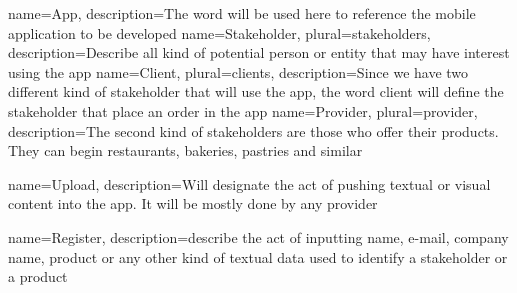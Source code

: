 
\makeglossaries


 {
    name={App},
    description={The word will be used here to reference the mobile application to be developed}
}
 {
    name={Stakeholder},
    plural={stakeholders},
    description={Describe all kind of potential person or entity that may have interest using the app}
}
 {
    name={Client},
    plural={clients},
    description={Since we have two different kind of stakeholder that will use the app, the word
                 client will define the stakeholder that place an order in the app}
}
 {
    name={Provider},
    plural={provider},
    description={The second kind of stakeholders are those who offer their products. They can begin
                restaurants, bakeries, pastries and similar}
}

 {
    name={Upload},
    description={Will designate the act of pushing textual or visual content into the app. It will
                be mostly done by any provider}
}

 {
    name={Register},
    description={describe the act of inputting name, e-mail, company name, product or any other kind of
    textual data used to identify a stakeholder or a product}
}




    
    \tableofcontents
    \newpage
    \clearpage
    \printglossary[type=acronym,title=Abbreviations,toctitle=Abbreviations]
    \clearpage
    \newpage
    \clearpage
    \printglossary[title=Glossary,toctitle=Glossary]
    \clearpage
    
    \nocite{*}
    
    
        

